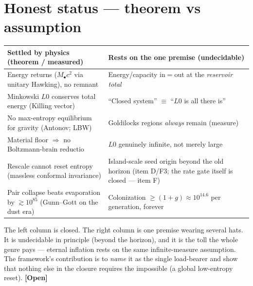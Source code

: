 \documentclass[11pt]{article}
\newcommand{\Open}{\textbf{\textcolor{gray!10!black}{[Open]}}}
\newcommand{\Mbh}{M_{\bullet}}
\begin{document}
\section{Honest status --- theorem vs assumption}
\begin{center}\small
\begin{tabular}{@{}p{}p{}@{}}
\toprule
Settled by physics (theorem / measured) & Rests on the one premise (undecidable) \\
\midrule
Energy returns ($\Mbh c^2$ via unitary Hawking), no remnant & Energy/capacity in$=$out at the \emph{reservoir total} \\
Minkowski $L0$ conserves total energy (Killing vector) & ``Closed system'' $\equiv$ ``$L0$ is all there is'' \\
No max-entropy equilibrium for gravity (Antonov; LBW) & Goldilocks regions \emph{always} remain (measure) \\
Material floor $\Rightarrow$ no Boltzmann-brain reductio & $L0$ genuinely infinite, not merely large \\
Rescale cannot reset entropy (massless conformal invariance) & Island-scale seed origin beyond the old horizon (item D/F3; the rate gate itself is closed --- item F) \\
Pair collapse beats evaporation by $\gtrsim\!10^{85}$ (Gunn--Gott on the dust era) & Colonization $\ge(1+g)\approx10^{14.6}$ per generation, forever \\
\bottomrule
\end{tabular}
\end{center}
The left column is closed. The right column is one premise wearing several hats. It is undecidable in principle (beyond the horizon), and it is the toll the whole genre pays --- eternal inflation rests on the same infinite-measure assumption. The framework's contribution is to \emph{name} it as the single load-bearer and show that nothing else in the closure requires the impossible (a global low-entropy reset). \Open

\end{document}

